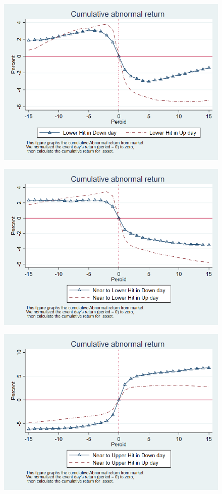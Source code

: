 \documentclass[12pt]{article}
\begin{document}
\begin{figure}[htbp]
\centering
\includegraphics[width=0.7\linewidth]{LPNAbR}
\caption{}
\label{fig:LPNAbR}
\end{figure}
\begin{figure}[htbp]
\centering
\includegraphics[width=0.7\linewidth]{CLPNAbR}
\caption{}
\label{fig:CLPNAbR}
\end{figure}
\begin{figure}[htbp]
\centering
\includegraphics[width=0.7\linewidth]{CUPNAbR}
\caption{}
\label{fig:CUPNAbR}
\end{figure}
\end{document}
